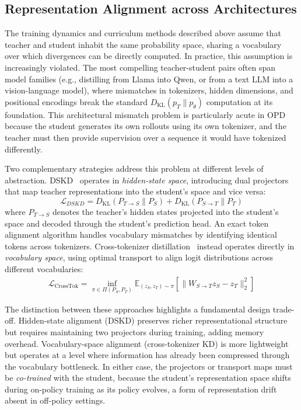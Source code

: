 \documentclass{article} %
\newcommand{\KL}{D_{\mathrm{KL}}}
\newcommand{\ptheta}{p_\theta}
\newcommand{\pteacher}{p_T}
\begin{document}
\subsection{Representation Alignment across Architectures}
\label{subsec:representation}

The training dynamics and curriculum methods described above assume that teacher and student inhabit the same probability space, sharing a vocabulary over which divergences can be directly computed. In practice, this assumption is increasingly violated. The most compelling teacher-student pairs often span model families (e.g., distilling from Llama into Qwen, or from a text LLM into a vision-language model), where mismatches in tokenizers, hidden dimensions, and positional encodings break the standard $\KL(\pteacher \parallel \ptheta)$ computation at its foundation. This architectural mismatch problem is particularly acute in OPD because the student generates its own rollouts using its own tokenizer, and the teacher must then provide supervision over a sequence it would have tokenized differently.

Two complementary strategies address this problem at different levels of abstraction. DSKD~\citep{2504.11426} operates in \emph{hidden-state space}, introducing dual projectors that map teacher representations into the student's space and vice versa:
\begin{equation}
    \mathcal{L}_{DSKD} = \KL(P_{T \to S} \parallel P_S) + \KL(P_{S \to T} \parallel P_T)
\end{equation}
where $P_{T \to S}$ denotes the teacher's hidden states projected into the student's space and decoded through the student's prediction head. An exact token alignment algorithm handles vocabulary mismatches by identifying identical tokens across tokenizers. Cross-tokenizer distillation~\citep{2402.12030} instead operates directly in \emph{vocabulary space}, using optimal transport to align logit distributions across different vocabularies:
\begin{align}
\mathcal{L}_{\text{CrossTok}} = \inf_{\pi \in \Pi(P_S, P_T)} \mathbb{E}_{(z_S, z_T) \sim \pi} \left[ \parallel W_{S \to T} z_S - z_T \parallel_2^2 \right]
\end{align}

The distinction between these approaches highlights a fundamental design trade-off. Hidden-state alignment (DSKD) preserves richer representational structure but requires maintaining two projectors during training, adding memory overhead. Vocabulary-space alignment (cross-tokenizer KD) is more lightweight but operates at a level where information has already been compressed through the vocabulary bottleneck. In either case, the projectors or transport maps must be \emph{co-trained} with the student, because the student's representation space shifts during on-policy training as its policy evolves, a form of representation drift absent in off-policy settings.
\end{document}
